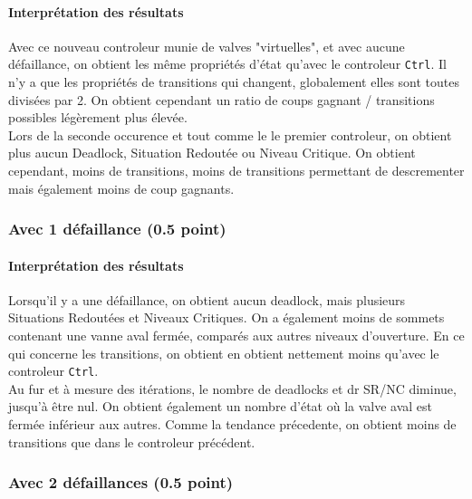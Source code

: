 \documentclass[a4paper]{book}
\begin{document}
\paragraph{Interprétation des résultats}
Avec ce nouveau controleur munie de valves "virtuelles", et avec aucune défaillance, on obtient les même 
propriétés d'état qu'avec le controleur {\tt Ctrl}. Il n'y a que les propriétés de transitions qui changent, 
globalement elles sont toutes divisées par 2. On obtient cependant un ratio de coups gagnant / transitions possibles légèrement plus élevée.  \\
Lors de la seconde occurence et tout comme le le premier controleur, on obtient plus aucun Deadlock, Situation Redoutée ou Niveau Critique. 
On obtient cependant, moins de transitions, moins de transitions permettant de descrementer mais également moins de coup gagnants.

\subsubsection{Avec 1 défaillance (0.5 point)}





\paragraph{Interprétation des résultats}
Lorsqu'il y a une défaillance, on obtient aucun deadlock, mais plusieurs Situations Redoutées et Niveaux Critiques. 
On a également moins de sommets contenant une vanne aval fermée, comparés aux autres niveaux d'ouverture. En ce qui concerne les 
transitions, on obtient en obtient nettement moins qu'avec le controleur {\tt Ctrl}. \\
Au fur et à mesure des itérations, le nombre de deadlocks et dr SR/NC diminue, jusqu'à être nul. On obtient également un nombre d'état où la valve aval est fermée
inférieur aux autres. Comme la tendance précedente, on obtient moins de transitions que dans le controleur précédent.

\subsubsection{Avec 2 défaillances (0.5 point)}




%
\end{document}
